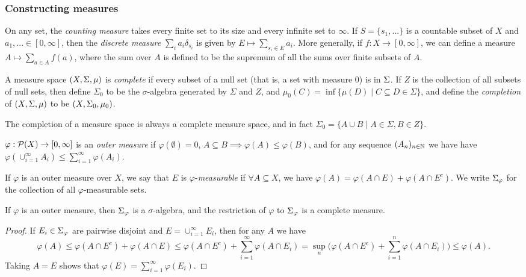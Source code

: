 \documentclass[letterpaper,11pt]{report}
\begin{document}
\subsubsection{Constructing measures}

\begin{defn} On any set, the \emph{counting measure} takes every finite set to its size and every infinite set to $\infty$. If $S = \{s_1, ...\}$ is a countable subset of $X$ and $a_1, ... \in [0,\infty]$, then the \emph{discrete measure} $\sum_i a_i\delta_{s_i}$ is given by $E \mapsto \sum_{s_i \in E} a_i$. More generally, if $f : X \rightarrow [0,\infty]$, we can define a measure $A \mapsto \sum_{a \in A} f(a)$, where the sum over $A$ is defined to be the supremum of all the sums over finite subsets of $A$.
\end{defn}

\begin{defn} A measure space $(X, \Sigma, \mu)$ is \emph{complete} if every subset of a null set (that is, a set with measure $0$) is in $\Sigma$. If $Z$ is the collection of all subsets of null sets, then define $\Sigma_0$ to be the $\sigma$-algebra generated by $\Sigma$ and $Z$, and $\mu_0(C) = \inf\{\mu(D) \mid C \subseteq D \in \Sigma\}$, and define the \emph{completion} of $(X,\Sigma,\mu)$ to be $(X,\Sigma_0,\mu_0)$.
\end{defn}

\begin{prop} The completion of a measure space is always a complete measure space, and in fact $\Sigma_0 = \{A \cup B \mid A \in \Sigma, B \in Z\}$.
\end{prop}

\begin{defn} $\varphi : \mathcal{P}(X) \rightarrow [0,\infty]$ is an \emph{outer measure} if $\varphi(\emptyset) = 0$, $A \subseteq B \implies \varphi(A) \le \varphi(B)$, and for any sequence $(A_n)_{n\in \mathbb{N}}$ we have have $\varphi(\cup_{i=1}^\infty A_i) \le \sum_{i=1}^\infty \varphi(A_i)$.
\end{defn}

\begin{defn} If $\varphi$ is an outer measure over $X$, we say that $E$ is $\varphi$-\emph{measurable} if $\forall A \subseteq X$, we have $\varphi(A) = \varphi(A\cap E) + \varphi(A\cap E^c)$. We write $\Sigma_\varphi$ for the collection of all $\varphi$-measurable sets.
\end{defn}

\begin{thm} If $\varphi$ is an outer measure, then $\Sigma_\varphi$ is a $\sigma$-algebra, and the restriction of $\varphi$ to $\Sigma_\varphi$ is a complete measure.
\end{thm}
\begin{proof} If $E_i \in \Sigma_\varphi$ are pairwise disjoint and $E = \cup_{i=1}^\infty E_i$, then for any $A$ we have
\[
\varphi(A) \le \varphi(A\cap E^c) + \varphi(A\cap E) \le \varphi(A\cap E^c) + \sum_{i=1}^\infty \varphi(A\cap E_i) = \sup_n \Big(\varphi(A\cap E^c) + \sum_{i=1}^n \varphi(A\cap E_i)\Big) \le \varphi(A).
\]
Taking $A = E$ shows that $\varphi(E) = \sum_{i=1}^\infty \varphi(E_i)$.
\end{proof}
\end{document}
